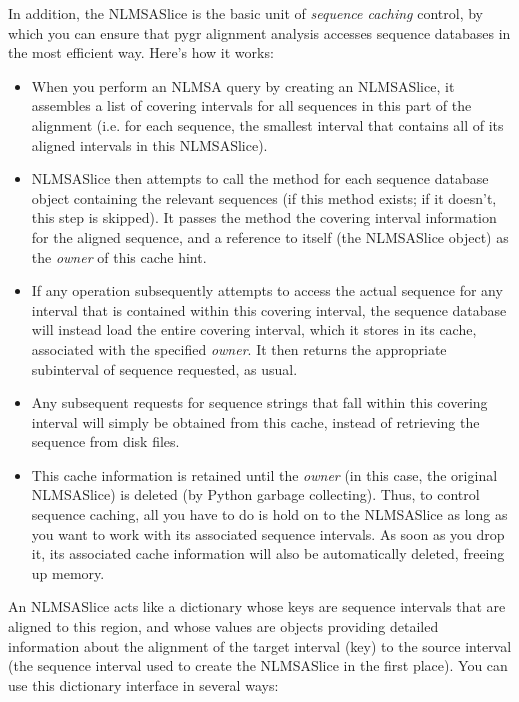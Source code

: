 \documentclass{howto}
\begin{document}
In addition, the NLMSASlice is the basic unit of {\em sequence caching}
control, by which you can ensure that pygr alignment analysis accesses
sequence databases in the most efficient way.  Here's how it works:
\begin{itemize}
\item When you perform an NLMSA query by creating an NLMSASlice, it assembles
a list of covering intervals for all sequences in this part of the alignment
(i.e. for each sequence, the smallest interval that contains all of its
aligned intervals in this NLMSASlice).  

\item NLMSASlice then attempts to call the  method for each
sequence database object containing the relevant sequences (if this method 
exists; if it doesn't, this step is skipped).  It passes the  method 
the covering interval information for the aligned sequence, and a reference to 
itself (the NLMSASlice object) as the {\em owner} of this cache hint.

\item If any operation subsequently attempts to access the actual sequence
for any interval that is contained within this covering interval, the sequence
database will instead load the entire covering interval, which it stores in 
its cache, associated with the specified {\em owner}.  It then returns the
appropriate subinterval of sequence requested, as usual.

\item Any subsequent requests for sequence strings that fall within this 
covering interval will simply be obtained from this cache, instead of 
retrieving the sequence from disk files.

\item This cache information is retained until the {\em owner} (in this case,
the original NLMSASlice) is deleted (by Python garbage collecting).  Thus, to
control sequence caching, all you have to do is hold on to the NLMSASlice as
long as you want to work with its associated sequence intervals.  As soon as 
you drop it, its associated cache information will also be automatically deleted,
freeing up memory.
\end{itemize}

An NLMSASlice acts like a dictionary whose keys are
sequence intervals that are aligned to this region, and whose values are
 objects providing detailed information about the alignment of
the target interval (key) to the source interval (the sequence interval
used to create the NLMSASlice in the first place).  You can use this
dictionary interface in several ways:
\end{document}
